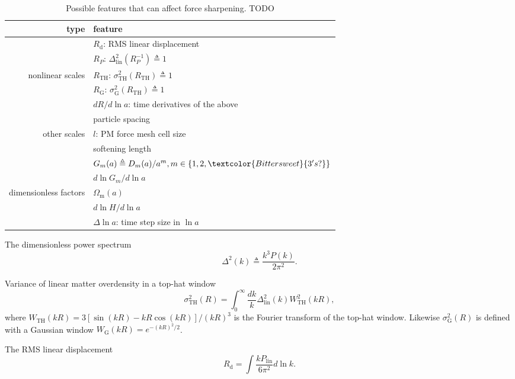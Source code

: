 \documentclass[modern, trackchanges, dvipsnames]{aastex631}
\renewcommand{\d}{d}
\newcommand{\lna}{\ln\!a}
\newcommand{\lnk}{\ln\!k}
\newcommand{\Omegam}{\Omega_\mathrm{m}}
\newcommand{\linear}{\mathrm{lin}}
\newcommand{\tophat}{\mathrm{TH}}
\newcommand{\gauss}{\mathrm{G}}
\newcommand{\YL}[1]{\textcolor{Bittersweet}{#1}}
\begin{document}
\begin{table}
\centering
\caption{Possible features that can affect force sharpening. TODO}
\label{tab:feat}
\begin{tabular}{rl}
\toprule
type & feature \\
\midrule
& $R_\mathrm{d}$: RMS linear displacement \\
\cmidrule(lr){2-2}
& $R_P$: $\Delta_\linear^2(R_P^{-1}) \triangleq 1$ \\
\cmidrule(lr){2-2}
nonlinear scales & $R_\tophat$: $\sigma_\tophat^2(R_\tophat) \triangleq 1$ \\
\cmidrule(lr){2-2}
& $R_\gauss$: $\sigma_\gauss^2(R_\tophat) \triangleq 1$ \\
\cmidrule(lr){2-2}
& $\d R / \d\lna$: time derivatives of the above \\
\midrule
& particle spacing \\
\cmidrule(lr){2-2}
other scales & $l$: PM force mesh cell size \\
\cmidrule(lr){2-2}
& softening length \\
\midrule
& $G_m(a) \triangleq D_m(a) / a^m, m \in \{1, 2, \YL{3's?}\}$ \\
\cmidrule(lr){2-2}
& $\d\ln G_m / \d\lna$ \\
\cmidrule(lr){2-2}
dimensionless factors & $\Omegam(a)$ \\
\cmidrule(lr){2-2}
& $\d\ln\!H / \d\lna$ \\
\cmidrule(lr){2-2}
& $\Delta\lna$: time step size in $\lna$ \\
\bottomrule
\end{tabular}
\end{table}

The dimensionless power spectrum
%
\begin{equation}
\Delta^2(k) \triangleq \frac{k^3 P(k)}{2 \pi^2}.
\end{equation}

Variance of linear matter overdensity in a top-hat window
%
\begin{equation}
\sigma_\tophat^2(R) = \int_0^\infty \frac{\d k}k
  \Delta_\linear^2(k) W_\tophat^2(kR),
\end{equation}
where $W_\tophat(kR) = 3[\sin(kR) - kR\cos(kR)] / (kR)^3$ is the
Fourier transform of the top-hat window.
Likewise $\sigma_\gauss^2(R)$ is defined with a Gaussian window
$W_\gauss(kR) = e^{-(kR)^2/2}$.

The RMS linear displacement
%
\begin{equation}
R_\mathrm{d} = \int \frac{k P_\linear}{6\pi^2} \d\lnk.
\end{equation}
%
\end{document}
